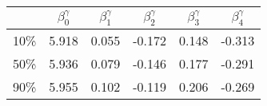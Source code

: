 \begin{tabular}{cccccc}
\hline
 & $\beta_0^{\gamma}$ & $\beta_1^{\gamma}$ & $\beta_2^{\gamma}$ & $\beta_3^{\gamma}$ & $\beta_4^{\gamma}$ \\
\hline
10\% &  5.918 & 0.055 & -0.172 & 0.148 & -0.313 \\
50\% & 5.936 & 0.079 & -0.146 & 0.177 & -0.291 \\
90\% &  5.955 & 0.102 & -0.119 & 0.206 & -0.269 \\
\hline
\end{tabular}